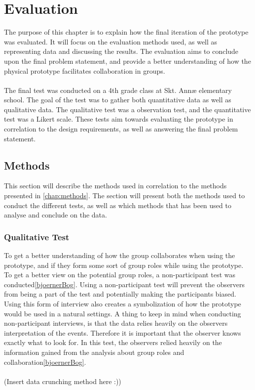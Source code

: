 \chapter{Evaluation}

The purpose of this chapter is to explain how the final iteration of the prototype was evaluated. It will focus on the evaluation methods used, as well as representing data and discussing the results. The evaluation aims to conclude upon the final problem statement, and provide a better understanding of how the physical prototype facilitates collaboration in groups.\\\\

The final test was conducted on a 4th grade class at Skt. Annæ elementary school. The goal of the test was to gather both quantitative data as well as qualitative data. The qualitative test was a observation test, and the quantitative test was a Likert scale. These tests aim towards evaluating the prototype in correlation to the design requirements, as well as answering the final problem statement.

\section{Methods}
This section will describe the methods used in correlation to the methods presented in \autoref{chap:methods}. The section will present both the methods used to conduct the different tests, as well as which methods that has been used to analyse and conclude on the data. 

\subsection{Qualitative Test}

To get a better understanding of how the group collaborates when using the prototype, and if they form some sort of group roles while using the prototype. To get a better view on the potential group roles, a non-participant test was conducted\ref{bjoernerBog}. Using a non-participant test will prevent the observers from being a part of the test and potentially making the participants biased. Using this form of interview also creates a symbolization of how the prototype would be used in a natural settings. A thing to keep in mind when conducting non-participant interviews, is that the data relies heavily on the observers interpretation of the events. Therefore it is important that the observer knows exactly what to look for. In this test, the observers relied heavily on the information gained from the analysis about group roles and collaboration\ref{bjoernerBog}.\\\\
(Insert data crunching method here :))

